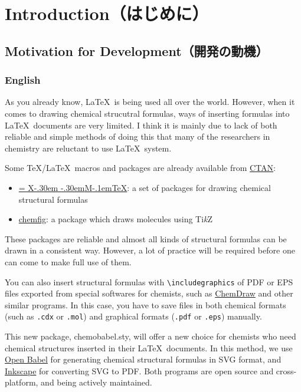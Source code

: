 \documentclass[dvipdfmx,12pt]{jsarticle}
\def\XyM{\ifnum\fam=-1\relax\fam=0\relax\fi\TestCount=\fam%
X\kern-.30em\smash{\raise.50ex\hbox{$\fam\TestCount\Upsilon$}}%
\kern-.30em{M}}
\def\XyMTeX{\XyM\kern-.1em\TeX}
\begin{document}
\clearpage
\setcounter{tocdepth}{3}
\tableofcontents

\clearpage
{}

\section{Introduction（はじめに）}

\subsection{Motivation for Development（開発の動機）}

\subsubsection{English}

As you already know, \LaTeX\ is being used all over the world.
However, when it comes to drawing chemical strucutral formulas,
ways of inserting formulas into \LaTeX\ documents are very limited.
I think it is mainly due to lack of both reliable and simple methods
of doing this that many of the researchers in chemistry are reluctant
to use \LaTeX\ system.

Some \TeX/\LaTeX\ macros and packages are already available from
\href{http://www.ctan.org/}{CTAN}:
\begin{itemize}
  \item \href{http://www.ctan.org/pkg/xymtex}{\XyMTeX}:
    a set of packages for drawing chemical structural formulas
\item \href{http://www.ctan.org/pkg/chemfig}{\textsf{chemfig}}:
    a package which draws molecules using Ti\textit{k}Z
\end{itemize}
These packages are reliable and almost all kinds of structural formulas
can be drawn in a consistent way. However, a lot of practice will be
required before one can come to make full use of them.

You can also insert structural formulas with \verb|\includegraphics| of
PDF or EPS files exported from special softwares for chemists, such as
\href{http://www.cambridgesoft.com/Ensemble_for_Chemistry/ChemDraw/}{ChemDraw}
and other similar programs.
In this case, you have to save files in both chemical formats
(such as \verb|.cdx| or \verb|.mol|) and graphical formats
(\verb|.pdf| or \verb|.eps|) manually.

This new package, \textsf{chemobabel.sty}, will offer a new choice for
chemists who need chemical structures inserted in their \LaTeX\ documents.
In this method, we use \href{http://openbabel.org/}{Open Babel} for
generating chemical structural formulas in SVG format,
and \href{https://inkscape.org/en/}{Inkscape} for converting SVG to PDF.
Both programs are open source and cross-platform, and being actively maintained. \\
\end{document}

